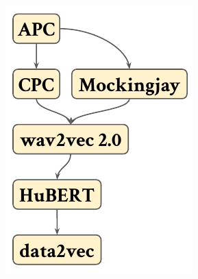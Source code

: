 \begin{frame}
    \frametitle{\vphantom{ABCDEFGHJIJKLMNOPQRSTVWXYZ}{Development of SSL for speech}}
    \begin{columns}[t]
        \hspace{0.025\textwidth}
        \begin{column}{0.20\textwidth}
            \begin{figure}[\textwidth]
                \centering
                \includegraphics[width=\textwidth]{figures/brief-flow-0.pdf}
            \end{figure}
        \end{column}
        {\textcolor{black!40}{\vrule{}}}
        \begin{column}{0.40\textwidth}
            {\vspace{0.10\textheight}\footnotesize}
        \end{column}

\end{columns}
\end{frame}
